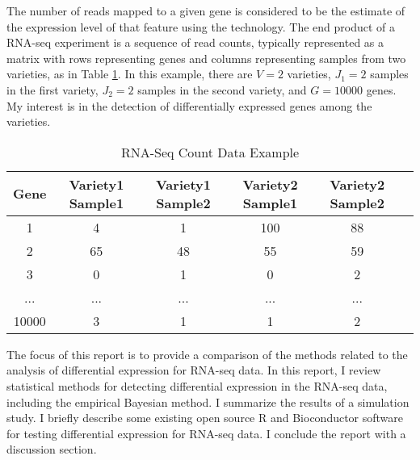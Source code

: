 The number of reads mapped to a given gene is considered to be the estimate of the expression level of that feature using the technology. The end product of a RNA-seq experiment is a sequence of read counts, typically represented as a matrix with rows representing genes and columns representing samples from two varieties, as in Table \ref{tab:RNA-Seq Data}. In this example, there are $V=2$ varieties, $J_1 = 2$ samples in the first variety, $J_2=2$ samples in the second variety, and $G=10000$ genes. My interest is in the detection of differentially expressed genes among the varieties. 

\begin{table}[H]
\begin{center}
    \begin{tabular}{|c|c|c|c|c|c|}
      \hline
      Gene &Variety1 Sample1 &Variety1 Sample2 &Variety2 Sample1 & Variety2 Sample2 \\
      \hline
      1 & 4 & 1 & 100 & 88 \\
      \hline
      2 & 65 & 48 & 55 & 59 \\
      \hline
      3 & 0 & 1 & 0 & 2\\
      \hline
      ... & ... & ... & ... & ...\\
      \hline
       10000 & 3 & 1 & 1 & 2\\
       \hline
    \end{tabular}
\end{center}
\caption{RNA-Seq Count Data Example}
\label{tab:RNA-Seq Data}
\end{table}

The focus of this report is to provide a comparison of the methods related to the analysis of differential expression for RNA-seq data. In this report, I review statistical methods for detecting differential expression in the RNA-seq data, including the empirical Bayesian method. I summarize the results of a simulation study. I briefly describe some existing open source R and Bioconductor software for testing differential expression for RNA-seq data. I conclude the report with a discussion section. 

